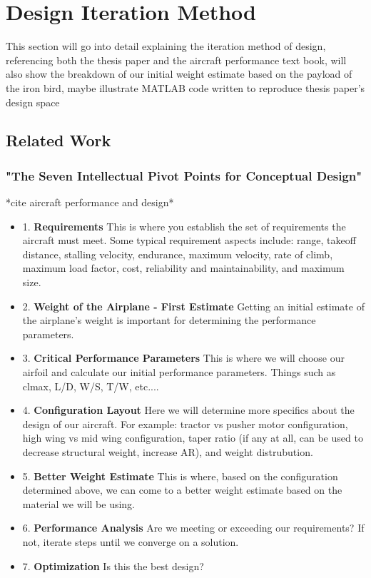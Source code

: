 \documentclass[]{article}
\begin{document}
\section{Design Iteration Method}
This section will go into detail explaining the iteration method of design, referencing both the thesis paper and the aircraft performance text book, will also show the breakdown of our initial weight estimate based on the payload of the iron bird, maybe illustrate MATLAB code written to reproduce thesis paper's design space

\subsection{Related Work}

\subsubsection{"The Seven Intellectual Pivot Points for Conceptual Design"}*cite aircraft performance and design*

\begin{itemize}

\item 1. {\bf Requirements} This is where you establish the set of requirements the aircraft must meet.  Some typical requirement aspects include: range, takeoff distance, stalling velocity, endurance, maximum velocity, rate of climb, maximum load factor, cost, reliability and maintainability, and maximum size.

\item 2. {\bf Weight of the Airplane - First Estimate} Getting an initial estimate of the airplane's weight is important for determining the performance parameters.

\item 3. {\bf Critical Performance Parameters}  This is where we will choose our airfoil and calculate our initial performance parameters.  Things such as clmax, L/D, W/S, T/W, etc....

\item 4. {\bf Configuration Layout} Here we will determine more specifics about the design of our aircraft.  For example: tractor vs pusher motor configuration, high wing vs mid wing configuration, taper ratio (if any at all, can be used to decrease structural weight, increase AR), and weight distrubution.

\item 5. {\bf Better Weight Estimate} This is where, based on the configuration determined above, we can come to a better weight estimate based on the material we will be using.  

\item 6. {\bf Performance Analysis} Are we meeting or exceeding our requirements?  If not, iterate steps until we converge on a solution.

\item 7. {\bf Optimization} Is this the best design?

\end{itemize}
\end{document}

